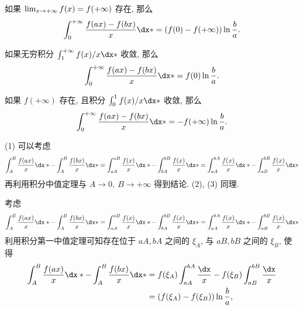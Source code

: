\begin{exercise}[series=exer]
  \begin{exercise}
      \item  如果 $ \lim_{x \to +\infty}f(x) = f(+\infty) $ 存在, 那么
      \begin{align*}
          \int_{0}^{+\infty} \frac{f(ax) - f(bx)}{x} \dx* = \qty(f(0) - f(+\infty))\ln\frac{b}{a}.
      \end{align*}
      \item 如果无穷积分 $ \int_{1}^{+\infty} f(x)/x \dx* $ 收敛, 那么
      \begin{align*}
          \int_{0}^{+\infty} \frac{f(ax) - f(bx)}{x} \dx* = f(0)\ln\frac{b}{a}.
      \end{align*}
      \item 如果 $ f(+\infty) $ 存在, 且积分 $ \int_{0}^{1} f(x)/x \dx* $ 收敛, 那么
      \begin{align*}
          \int_{0}^{+\infty} \frac{f(ax) - f(bx)}{x} \dx* = - f(+\infty)\ln\frac{b}{a}.
      \end{align*}
  \end{exercise}
  \begin{hint}
      (1) 可以考虑
      \begin{align*}
          \int_{A}^{B} \frac{f(ax)}{x} \dx* - \int_{A}^{B} \frac{f(bx)}{x} \dx* = \int_{aA}^{aB} \frac{f(x)}{x} \dx* - \int_{bA}^{bB} \frac{f(x)}{x} \dx* = \int_{aA}^{bA} \frac{f(x)}{x} \dx* - \int_{aB}^{bB} \frac{f(x)}{x} \dx*
      \end{align*}
      再利用积分中值定理与 $ A \to 0,\ B \to +\infty $ 得到结论. (2), (3) 同理.
  \end{hint}
  \begin{answer}
    \begin{answersheet}
      \item 考虑
      \begin{align*}
        \int_{A}^{B} \frac{f(ax)}{x} \dx* - \int_{A}^{B} \frac{f(bx)}{x} \dx* = \int_{aA}^{aB} \frac{f(x)}{x} \dx* - \int_{bA}^{bB} \frac{f(x)}{x} \dx* = \int_{aA}^{bA} \frac{f(x)}{x} \dx* - \int_{aB}^{bB} \frac{f(x)}{x} \dx*
      \end{align*}
      利用积分第一中值定理可知存在位于 $ aA, bA $ 之间的 $ \xi_{A} $, 与 $ aB, bB $ 之间的 $ \xi_{B} $, 使得
      \begin{align*}
        \int_{A}^{B} \frac{f(ax)}{x} \dx* - \int_{A}^{B} \frac{f(bx)}{x} \dx* 
        & = f(\xi_{A}) \int_{aA}^{bA} \frac{\dx}{x} - f(\xi_{B}) \int_{aB}^{bB} \frac{\dx}{x} \\
        & = (f(\xi_{A}) - f(\xi_{B})) \ln \frac{b}{a},

\end{align*}
\end{answersheet}
\end{answer}
\end{exercise}
